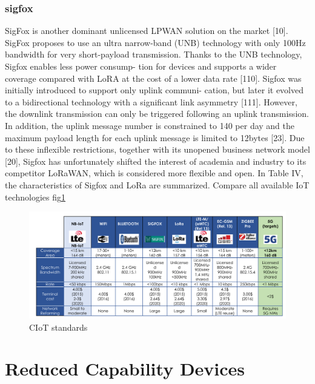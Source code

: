 \documentclass[conference]{IEEEtran}
\begin{document}
\subsubsection{sigfox}
\label{sec:1-2-2}
SigFox is another dominant unlicensed LPWAN
solution on the market [10]. SigFox proposes to use an
ultra narrow-band (UNB) technology with only 100Hz
bandwidth for very short-payload transmission. Thanks to
the UNB technology, Sigfox enables less power consump-
tion for devices and supports a wider coverage compared
with LoRA at the cost of a lower data rate [110]. Sigfox
was initially introduced to support only uplink communi-
cation, but later it evolved to a bidirectional technology
with a significant link asymmetry [111]. However, the
downlink transmission can only be triggered following
an uplink transmission. In addition, the uplink message
number is constrained to 140 per day and the maximum
payload length for each uplink message is limited to
12bytes [23]. Due to these inflexible restrictions, together
with its unopened business network model [20], Sigfox
has unfortunately shifted the interest of academia and
industry to its competitor LoRaWAN, which is considered
more flexible and open. In Table IV, the characteristics
of Sigfox and LoRa are summarized.
Compare all available IoT technologies fig\ref{fig:all-iot}




\begin{figure}
    \centering
    \includegraphics[width=\linewidth]{Pictures/IoT standards.png}
    \caption{CIoT standards}
    \label{fig:all-iot}
\end{figure}



\section{Reduced Capability Devices}
\label{sec:3-RedCap-Intro}

\end{document}
